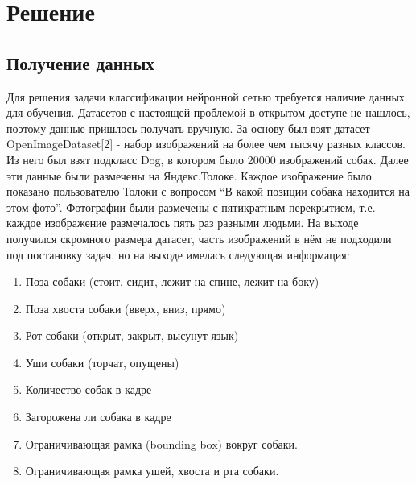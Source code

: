 \chapter{Решение} \label{chapt3}

\section{Получение данных} \label{sect3_1}
Для решения задачи классификации нейронной сетью требуется наличие данных для обучения. Датасетов с настоящей проблемой в открытом доступе не нашлось, поэтому данные пришлось получать вручную. За основу был взят датасет OpenImageDataset[2] - набор изображений на более чем тысячу разных классов. Из него был взят подкласс Dog, в котором было 20000 изображений собак. Далее эти данные были размечены на Яндекс.Толоке. Каждое изображение было показано пользователю Толоки с вопросом “В какой позиции собака находится на этом фото”. Фотографии были размечены с пятикратным перекрытием, т.е. каждое изображение размечалось пять раз разными людьми.
На выходе получился скромного размера датасет, часть изображений в нём не подходили под постановку задач, но на выходе имелась следующая информация:
\begin{enumerate}
    \item Поза собаки (стоит, сидит, лежит на спине, лежит на боку)
    \item Поза хвоста собаки (вверх, вниз, прямо)
    \item Рот собаки (открыт, закрыт, высунут язык)
    \item Уши собаки (торчат, опущены)
    \item Количество собак в кадре
    \item Загорожена ли собака в кадре
    \item Ограничивающая рамка (bounding box) вокруг собаки.
    \item Ограничивающая рамка ушей, хвоста и рта собаки.
\end{enumerate}

